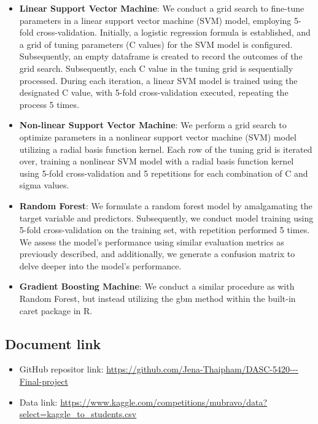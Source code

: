 \documentclass[11pt,singlespace]{article}
\begin{document}
\begin{itemize}
		\item \textbf{Linear Support Vector Machine}: We conduct a grid search to fine-tune parameters in a linear support vector machine (SVM) model, employing 5-fold cross-validation. Initially, a logistic regression formula is established, and a grid of tuning parameters (C values) for the SVM model is configured. Subsequently, an empty dataframe is created to record the outcomes of the grid search. Subsequently, each C value in the tuning grid is sequentially processed. During each iteration, a linear SVM model is trained using the designated C value, with 5-fold cross-validation executed, repeating the process 5 times.
		
		\item \textbf{Non-linear Support Vector Machine}: We perform a grid search to optimize parameters in a nonlinear support vector machine (SVM) model utilizing a radial basis function kernel. Each row of the tuning grid is iterated over, training a nonlinear SVM model with a radial basis function kernel using 5-fold cross-validation and 5 repetitions for each combination of C and sigma values.
		
		\item \textbf{Random Forest}: We formulate a random forest model by amalgamating the target variable and predictors. Subsequently, we conduct model training using 5-fold cross-validation on the training set, with repetition performed 5 times. We assess the model's performance using similar evaluation metrics as previously described, and additionally, we generate a confusion matrix to delve deeper into the model's performance.
		
		\item \textbf{Gradient Boosting Machine}: We conduct a similar procedure as with Random Forest, but instead utilizing the gbm method within the built-in caret package in R.
	\end{itemize}
	
	\subsection {Document link}
	\begin{itemize}
		\item GitHub repositor link: \url{https://github.com/Jena-Thaipham/DASC-5420---Final-project}
		
		\item Data link: \url{https://www.kaggle.com/competitions/mubravo/data?select=kaggle_to_students.csv}
	\end{itemize}
	
\end{document}
